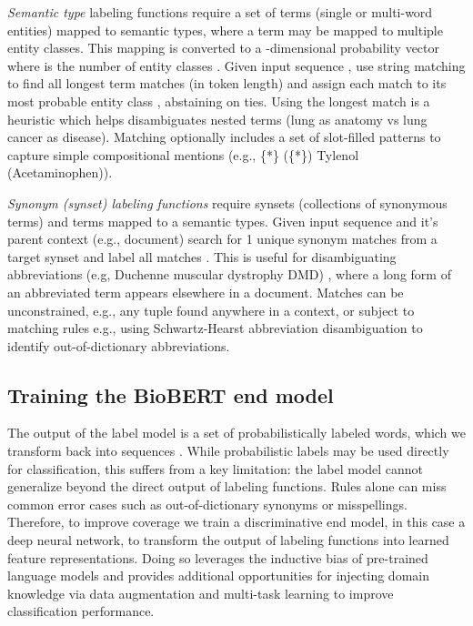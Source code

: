 \documentclass{article}
\begin{document}
\emph{Semantic type} labeling functions require a set of terms (single or multi-word entities)  mapped to semantic types, where a term may be mapped to multiple entity classes.
This mapping is converted to a -dimensional probability vector where  is the number of entity classes .
Given input sequence , use string matching to find all longest term matches (in token length) and assign each match to its most probable entity class , abstaining on ties.
Using the longest match is a heuristic which helps disambiguates nested terms ({lung} as anatomy vs {lung cancer} as disease).
Matching optionally includes a set of slot-filled patterns to capture simple compositional mentions (e.g., { \{*\} (\{*\})  Tylenol (Acetaminophen)}).

\emph{Synonym (synset) labeling functions} require synsets (collections of synonymous terms)  and terms  mapped to a semantic types.
Given input sequence  and it's parent context (e.g., document) search for 1 unique synonym matches from a target synset and label all matches . 
This is useful for disambiguating abbreviations (e.g, {Duchenne muscular dystrophy  DMD}) , where a long form of an abbreviated term appears elsewhere in a document. 
Matches can be unconstrained, e.g., any tuple found anywhere in a context, or subject to matching rules e.g., using Schwartz-Hearst abbreviation disambiguation \cite{Schwartz2003-mf} to identify out-of-dictionary abbreviations. 

\subsection*{Training the BioBERT end model}
The output of the label model is a set of probabilistically labeled words, which we transform back into sequences .  While probabilistic labels may be used directly for classification, this suffers from a key limitation: the label model cannot generalize beyond the direct output of labeling functions. Rules alone can miss common error cases such as out-of-dictionary synonyms or misspellings. Therefore, to improve coverage we train a discriminative end model, in this case a deep neural network, to transform the output of labeling functions into learned feature representations. Doing so leverages the inductive bias of pre-trained language models \cite{Devlin2019-qr} and provides additional opportunities for injecting domain knowledge via data augmentation \cite{Wei2019-fv} and multi-task learning \cite{Zhang2017-zd} to improve classification performance. 
\end{document}
